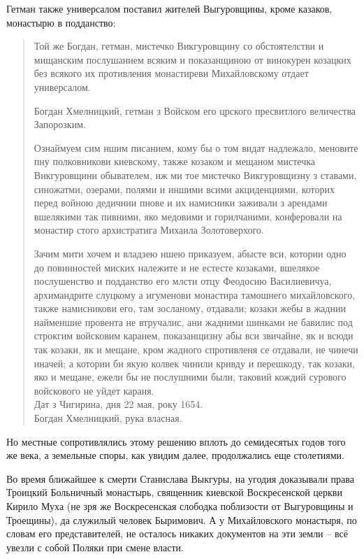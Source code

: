 Гетман также универсалом поставил жителей Выгуровщины, кроме казаков, монастырю в подданство\cite[81]{mihdocs}: 

\begin{quotation}
Той же Богдан, гетман, мистечко Викгуровщину со обстоятелстви и мищанским послушанием всяким и показанщиною от винокурен козацких без всякого их противления монастиреви Михайловскому отдает универсалом.

Богдан Хмелницкий, гетман з Войском его црского пресвитлого величества Запорозким.

Ознаймуем сим ншим писанием, кому бы о том видат надлежало, меновите пну полковникови киевскому, также козаком и мещаном мистечка Викгуровщини обывателем, иж ми тое мистечко Викгуровщизну з ставами, синожатми, озерами, полями и иншими всими акциденциями, которих перед войною дедичнии пнове и их намисники заживали з арендами вшелякими так пивними, яко медовими и горилчаними, конферовали на монастир стого архистратига Михаила Золотоверхого.

Зачим мити хочем и владзею ншею приказуем, абысте вси, котории одно до повинностей миских належите и не естесте козаками, вшелякое послушенство и подданство его млсти отцу Феодосию Василиевичуа, архимандрите слуцкому а игуменови монастира тамошнего михайловского, также намисникови его, там зосланому, отдавали; козаки жебы в жаднии найменшие провента не втручалис, ани жадними шинками не бавилис под строкгим войсковим каранем, показанщизну абы вси звичайне, як и всюди так козаки, як и мещане, кром жадного спротивленя се отдавали, не чинечи иначей; а котории би якую колвек чинили кривду и
перешкоду, так козаки, яко и мещане, ежели бы не послушними были, таковий кождий сурового войскового не уйдет караня.\\

Дат з Чигирина, дня 22 мая, року 1654.\\
Богдан Хмелницкий, рука власная.
\end{quotation}

Но местные сопротивлялись этому решению вплоть до семидесятых годов того же века, а земельные споры, как увидим далее, продолжались еще столетиями.

Во время ближайшее к смерти Станислава Выкгуры, на угодия доказывали права Троицкий Больничный монастырь, священник киевской Воскресенской церкви Кирило Муха (не зря же Воскресенская слободка поблизости от Выгуровщины и Троещины), да служилый человек Быримович. А у Михайловского монастыря, по словам его представителей, не осталось никаких документов на эти земли – всё увезли с собой Поляки при смене власти.

